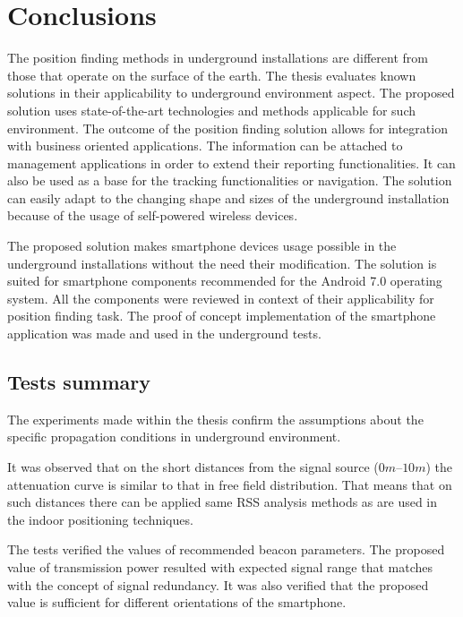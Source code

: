 \documentclass[../main.tex]{subfiles}
\begin{document}
\chapter{Conclusions}

The position finding methods in underground installations are different from those that operate on the surface of the earth. The thesis evaluates known solutions in their applicability to underground environment aspect. The proposed solution uses state-of-the-art technologies and methods applicable for such environment. The outcome of the position finding solution allows for integration with business oriented applications. The information can be attached to management applications in order to extend their reporting functionalities. It can also be used as a base for the tracking functionalities or navigation. The solution can easily adapt to the changing shape and sizes of the underground installation because of the usage of self-powered wireless devices.

The proposed solution makes smartphone devices usage possible in the underground installations without the need their modification. The solution is suited for smartphone components recommended for the Android 7.0 operating system. All the components were reviewed in context of their applicability for position finding task. The proof of concept implementation of the smartphone application was made and used in the underground tests.

\section{Tests summary} %
\label{sec:tests_summary}

The experiments made within the thesis confirm the assumptions about the specific propagation conditions in underground environment.

It was observed that on the short distances from the signal source ($0m$--$10m$) the attenuation curve is similar to that in free field distribution. That means that on such distances there can be applied same RSS analysis methods as are used in the indoor positioning techniques.

The tests verified the values of recommended beacon parameters. The proposed value of transmission power resulted with expected signal range that matches with the concept of signal redundancy. It was also verified that the proposed value is sufficient for different orientations of the smartphone.
\end{document}
